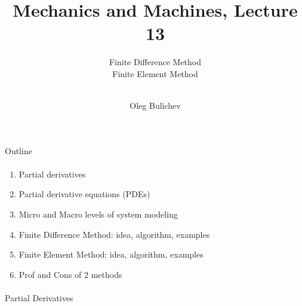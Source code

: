 \documentclass[aspectratio=169]{beamer}
\title[MaM]{Mechanics and Machines, Lecture 13} %
\subtitle{Finite Difference Method  
\\ Finite Element Method   \\   
\ } %
\author{Oleg Bulichev}
\newcommand{\fbckg}[1]{\usebackgroundtemplate{\texttt{[image: \#1]}}}%
\begin{document}
\setlength{\abovedisplayskip}{0pt}
\setlength{\belowdisplayskip}{0pt}
\setlength{\abovedisplayshortskip}{0pt}
\setlength{\belowdisplayshortskip}{0pt}

\fbckg{fibeamer/figs/title_page.png}

\fbckg{fibeamer/figs/common.png}

\note{\scriptsize \begin{itemize}
        \item \
    \end{itemize}}

\begin{frame}[t]{Outline}
    \framesubtitle{}
    \begin{enumerate}
        \item Partial derivatives
        \item Partial derivative equations (PDEs)
        \item Micro and Macro levels of system modeling
        \item Finite Difference Method: idea, algorithm, examples
        \item Finite Element Method: idea, algorithm, examples
        \item Prof and Cons of 2 methods
    \end{enumerate}
\end{frame}

\begin{frame}[c]{}
    \framesubtitle{}
    \centering \LARGE Partial Derivatives
\end{frame}
\end{document}

